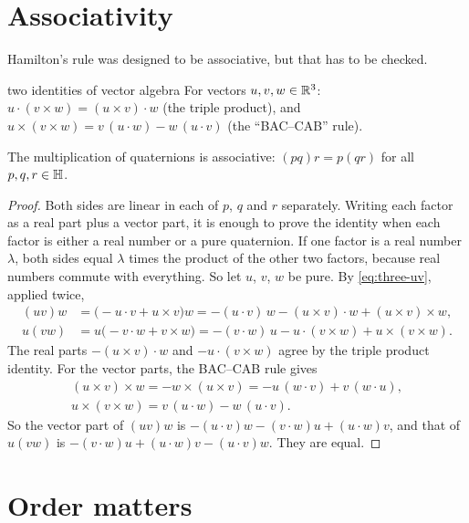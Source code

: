 
\section{Associativity}

Hamilton's rule was designed to be associative, but that has to be checked.

\begin{toolbox}{two identities of vector algebra}
For vectors $u,v,w\in\mathbb{R}^3$:
$u\cdot(v\times w)=(u\times v)\cdot w$ (the triple product), and
$u\times(v\times w)=v\,(u\cdot w)-w\,(u\cdot v)$ (the ``BAC--CAB'' rule).
\end{toolbox}

\begin{theorem}\label{thm:three-assoc}
The multiplication of quaternions is associative: $(pq)r=p(qr)$ for all $p,q,r\in\mathbb{H}$.
\end{theorem}

\begin{proof}
Both sides are linear in each of $p$, $q$ and $r$ separately. Writing each factor as a real part plus a vector part, it is enough to prove the identity when each factor is either a real number or a pure quaternion. If one factor is a real number $\lambda$, both sides equal $\lambda$ times the product of the other two factors, because real numbers commute with everything. So let $u$, $v$, $w$ be pure. By \eqref{eq:three-uv}, applied twice,
\begin{align*}
  (uv)w&=\bigl(-u\cdot v+u\times v\bigr)w=-(u\cdot v)\,w-(u\times v)\cdot w+(u\times v)\times w ,\\
  u(vw)&=u\bigl(-v\cdot w+v\times w\bigr)=-(v\cdot w)\,u-u\cdot(v\times w)+u\times(v\times w).
\end{align*}
The real parts $-(u\times v)\cdot w$ and $-u\cdot(v\times w)$ agree by the triple product identity. For the vector parts, the BAC--CAB rule gives
\begin{gather*}
  (u\times v)\times w=-w\times(u\times v)=-u\,(w\cdot v)+v\,(w\cdot u),\\
  u\times(v\times w)=v\,(u\cdot w)-w\,(u\cdot v).
\end{gather*}
So the vector part of $(uv)w$ is $-(u\cdot v)w-(v\cdot w)u+(u\cdot w)v$, and that of $u(vw)$ is $-(v\cdot w)u+(u\cdot w)v-(u\cdot v)w$. They are equal.
\end{proof}

\section{Order matters}

